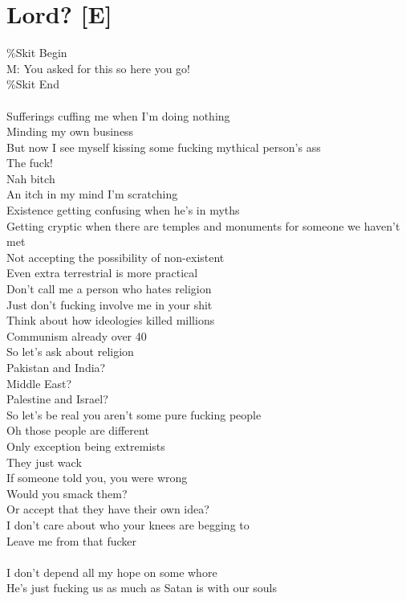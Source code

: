 \documentclass[12pt, b5paper, oneside]{book}
\begin{document}
\section{Lord? [E]}
\%Skit Begin
\\M: You asked for this so here you go!
\\\%Skit End
%
\\\\Sufferings cuffing me when I'm doing nothing
\\Minding my own business
\\But now I see myself kissing some fucking mythical person's ass
\\The fuck!
\\Nah bitch
\\An itch in my mind I'm scratching
\\Existence getting confusing when he's in myths
\\Getting cryptic when there are temples and monuments for someone we haven't met
\\Not accepting the possibility of non-existent
\\Even extra terrestrial is more practical
\\Don't call me a person who hates religion
\\Just don't fucking involve me in your shit
\\Think about how ideologies killed millions
\\Communism already over 40
\\So let's ask about religion
\\Pakistan and India?
\\Middle East?
\\Palestine and Israel?
\\So let's be real you aren't some pure fucking people
\\Oh those people are different
\\Only exception being extremists
\\They just wack
\\If someone told you, you were wrong
\\Would you smack them?
\\Or accept that they have their own idea?
\\I don't care about who your knees are begging to
\\Leave me from that fucker
%
\\\\I don't depend all my hope on some whore
\\He's just fucking us as much as Satan is with our souls
\end{document}
